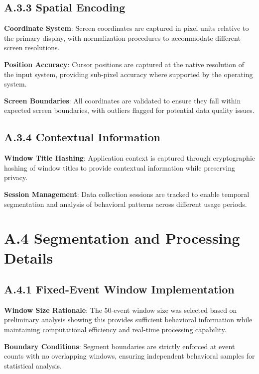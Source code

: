 \documentclass[
  12pt,
  a4paper,
]{report}
\begin{document}
\subsection{A.3.3 Spatial Encoding}\label{a.3.3-spatial-encoding}

\textbf{Coordinate System}: Screen coordinates are captured in pixel
units relative to the primary display, with normalization procedures to
accommodate different screen resolutions.

\textbf{Position Accuracy}: Cursor positions are captured at the native
resolution of the input system, providing sub-pixel accuracy where
supported by the operating system.

\textbf{Screen Boundaries}: All coordinates are validated to ensure they
fall within expected screen boundaries, with outliers flagged for
potential data quality issues.

\subsection{A.3.4 Contextual
Information}\label{a.3.4-contextual-information}

\textbf{Window Title Hashing}: Application context is captured through
cryptographic hashing of window titles to provide contextual information
while preserving privacy.

\textbf{Session Management}: Data collection sessions are tracked to
enable temporal segmentation and analysis of behavioral patterns across
different usage periods.

\section{A.4 Segmentation and Processing
Details}\label{a.4-segmentation-and-processing-details}

\subsection{A.4.1 Fixed-Event Window
Implementation}\label{a.4.1-fixed-event-window-implementation}

\textbf{Window Size Rationale}: The 50-event window size was selected
based on preliminary analysis showing this provides sufficient
behavioral information while maintaining computational efficiency and
real-time processing capability.

\textbf{Boundary Conditions}: Segment boundaries are strictly enforced
at event counts with no overlapping windows, ensuring independent
behavioral samples for statistical analysis.
\end{document}
